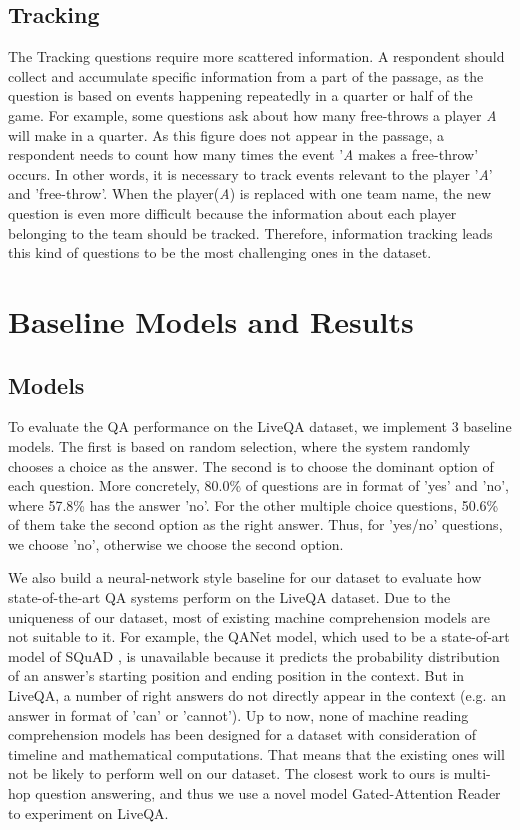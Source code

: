 \subsection{Tracking}
The Tracking questions require more scattered information. A respondent should collect and accumulate specific information from a part of the passage, as the question is based on events happening repeatedly in a quarter or half of the game. For example, some questions ask about how many free-throws a player \textit{A} will make in a quarter. As this figure does not appear in the passage, a respondent needs to count how many times the event '\textit{A} makes a free-throw' occurs. In other words, it is necessary to track events relevant to the player '\textit{A}' and 'free-throw'. When the player(\textit{A}) is replaced with one team name, the new question is even 
more difficult because the information about each player belonging to the team should be tracked. Therefore, information tracking leads this kind of questions to be the most challenging ones in the dataset.

\section{Baseline Models and Results}
\subsection{Models}
To evaluate the QA performance on the LiveQA dataset, we implement 3 baseline models. The first is based on  random selection, where the system randomly chooses a choice as the answer. The second is to choose the dominant option of each question. More concretely, 80.0\% of questions are in format of 'yes' and 'no', where 57.8\% has the answer 'no'. For the other multiple choice questions, 50.6\% of them take the second option as the right answer.
Thus, for 'yes/no' questions, we choose 'no', otherwise we choose the second option.

We also build a neural-network style baseline for our dataset to evaluate how state-of-the-art QA systems perform on the LiveQA dataset. Due to the uniqueness of our dataset, most of existing machine comprehension models are not suitable to it. For example, the QANet \cite{yu2018qanet} model, which used to be a state-of-art model of SQuAD \cite{rajpurkar2016squad}, is unavailable because it predicts the probability distribution of an answer's starting position and ending position in the context. But in LiveQA, a number of right answers do not directly appear in the context (e.g. an answer in format of 'can' or 'cannot'). 
Up to now, none of machine reading comprehension models has been designed for a dataset with consideration of timeline and mathematical computations. 
That means that the existing ones will not be likely to perform well on our dataset. The closest work to ours is multi-hop question answering, and thus we use a novel model Gated-Attention Reader \cite{dhingra2016gated} to experiment on LiveQA. 

